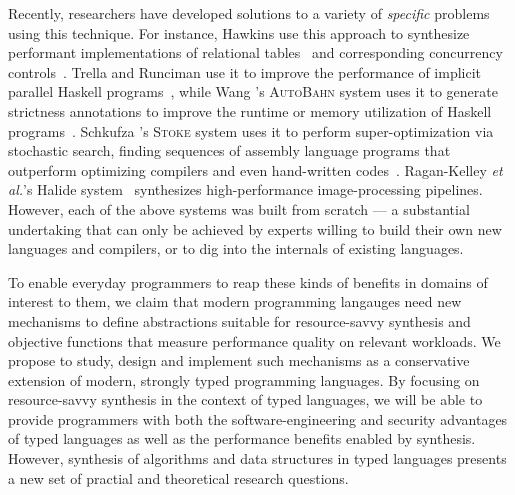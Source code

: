 Recently, researchers have developed solutions to a variety of \emph{specific} problems
using this technique.
For instance, Hawkins \etal{} use this approach to synthesize
performant implementations of relational tables~\cite{data-rep-synth}
and corresponding concurrency controls~\cite{conc-data-rep-synth}.
Trella and Runciman use it to improve the performance of implicit parallel
Haskell programs~\cite{implicit-parallel}, while
Wang \etal{}'s \textsc{AutoBahn} system uses it to generate strictness
annotations to improve the runtime or memory utilization of Haskell
programs~\cite{autobahn}.  Schkufza \etal{}'s \textsc{Stoke} system
uses it to perform super-optimization via stochastic search, finding
sequences of assembly language programs that outperform optimizing
compilers and even hand-written codes~\cite{stochastic-superopt}.
Ragan-Kelley \emph{et al.}'s Halide system~\cite{Ragan-Kelley:Halide} 
synthesizes high-performance
image-processing pipelines.
However, each of the above systems was built from scratch --- a substantial undertaking
that can only be achieved by experts willing to build their own new languages and
compilers, or to dig into the internals of existing languages.  


To enable everyday programmers to reap these kinds of benefits in
domains of interest to them, we claim that modern programming
langauges need new mechanisms to define abstractions suitable for
resource-savvy synthesis and objective functions that measure
performance quality on relevant workloads.  We propose to study,
design and implement such mechanisms as a conservative extension of
modern, strongly typed programming languages.  By focusing on
resource-savvy synthesis in the context of typed languages, we will be
able to provide programmers with both the software-engineering and
security advantages of typed languages as well as the performance
benefits enabled by synthesis.  However, synthesis of algorithms and
data structures in typed languages presents a new set of practial
and theoretical research questions.



